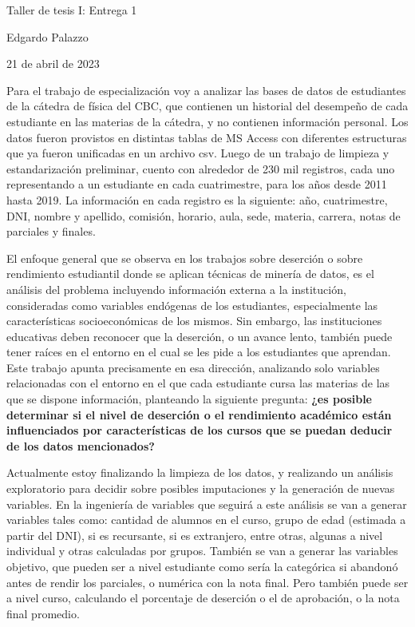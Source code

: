 \documentclass[a4paper,11pt]{article}
\begin{document}
{\huge Taller de tesis I: Entrega 1}\par \medskip
{\Large Edgardo Palazzo}\par
21 de abril de 2023 \par \medskip

Para el trabajo de especialización voy a analizar las bases de datos de estudiantes de la cátedra de física del CBC, que contienen un historial del desempeño de cada estudiante en las materias de la cátedra, y no contienen información personal. Los datos fueron provistos en distintas tablas de MS Access con diferentes estructuras que ya fueron unificadas en un archivo csv. Luego de un trabajo de limpieza y estandarización preliminar, cuento con alrededor de 230 mil registros, cada uno representando a un estudiante en cada cuatrimestre, para los años desde 2011 hasta 2019. La información en cada registro es la siguiente: año, cuatrimestre, DNI, nombre y apellido, comisión, horario, aula, sede, materia, carrera, notas de parciales y finales.\par\medskip

El enfoque general que se observa en los trabajos sobre deserción o sobre rendimiento estudiantil donde se aplican técnicas de minería de datos, es el análisis del problema incluyendo información externa a la institución\cite{kuna:abandono}, consideradas como variables endógenas de los estudiantes, especialmente las características socioeconómicas de los mismos\cite{GarciaDeFanelli:RAESrendimiento}. Sin embargo, las instituciones educativas deben reconocer que la deserción, o un avance lento, también puede tener raíces en el entorno en el cual se les pide a los estudiantes que aprendan\cite{Tinto:firstyear}. Este trabajo apunta precisamente en esa dirección, analizando solo variables relacionadas con el entorno en el que cada estudiante cursa las materias de las que se dispone información, planteando la siguiente pregunta: \textbf{¿es posible determinar si el nivel de deserción o el rendimiento académico están influenciados por características de los cursos que se puedan deducir de los datos mencionados?}

Actualmente estoy finalizando la limpieza de los datos, y realizando un análisis exploratorio para decidir sobre posibles imputaciones y la generación de nuevas variables. En la ingeniería de variables que seguirá a este análisis se van a generar variables tales como: cantidad de alumnos en el curso, grupo de edad (estimada a partir del DNI), si es recursante, si es extranjero, entre otras, algunas a nivel individual y otras calculadas por grupos. También se van a generar las variables objetivo, que pueden ser a nivel estudiante como sería la categórica si abandonó antes de rendir los parciales, o numérica con la nota final. Pero también puede ser a nivel curso, calculando el porcentaje de deserción o el de aprobación, o la nota final promedio.
\end{document}
